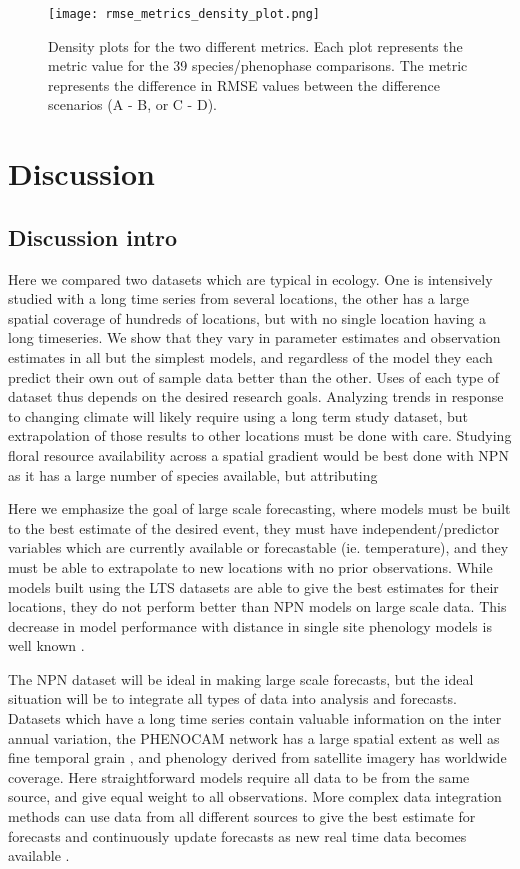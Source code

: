 \documentclass[fleqn,10pt,lineno]{wlpeerj} %
\begin{document}
\begin{figure}
	\centering
		\texttt{[image: rmse\_metrics\_density\_plot.png]}
	\caption{Density plots for the two different metrics. Each plot represents the metric value for the 39 species/phenophase comparisons. The metric represents the difference in RMSE values between the difference scenarios (A - B, or C - D).}
\end{figure}


\section*{Discussion}

\subsection{Discussion intro}

Here we compared two datasets which are typical in ecology. One is intensively studied with a long time series from several locations, the other has a large spatial coverage of hundreds of locations, but with no single location having a long timeseries. We show that they vary in parameter estimates and observation estimates in all but the simplest models, and regardless of the model they each predict their own out of sample data better than the other. Uses of each type of dataset thus depends on the desired research goals. Analyzing trends in response to changing climate will likely require using a long term study dataset, but extrapolation of those results to other locations must be done with care. Studying floral resource availability across a spatial gradient would be best done with NPN as it has a large number of species available, but attributing 

Here we emphasize the goal of large scale forecasting, where models must be built to the best estimate of the desired event, they must have independent/predictor variables which are currently available or forecastable (ie. temperature), and they must be able to extrapolate to new locations with no prior observations. While models built using the LTS datasets are able to give the best estimates for their locations, they do not perform better than NPN models on large scale data. This decrease in model performance with distance in single site phenology models is well known \citep{basler2016, xu2013, garcia-mozo2008}. 

The NPN dataset will be ideal in making large scale forecasts, but the ideal situation will be to integrate all types of data into analysis and forecasts. Datasets which have a long time series contain valuable information on the inter annual variation, the PHENOCAM network has a large spatial extent as well as fine temporal grain \citep{richardson2018}, and phenology derived from satellite imagery has worldwide coverage. Here straightforward models require all data to be from the same source, and give equal weight to all observations. More complex data integration methods can use data from all different sources to give the best estimate for forecasts \citep{ogle2015} and continuously update forecasts as new real time data becomes available \citep{luo2011}. 
\end{document}
